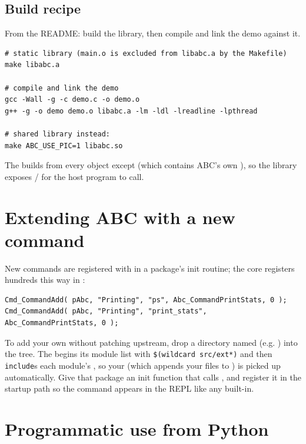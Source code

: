 \subsection{Build recipe}

From the README: build the library, then compile and link the demo against it.

\begin{lstlisting}[style=abcshell]
# static library (main.o is excluded from libabc.a by the Makefile)
make libabc.a

# compile and link the demo
gcc -Wall -g -c demo.c -o demo.o
g++ -g -o demo demo.o libabc.a -lm -ldl -lreadline -lpthread

# shared library instead:
make ABC_USE_PIC=1 libabc.so
\end{lstlisting}

\noindent The  builds  from every object except
 (which contains ABC's own ), so the
library exposes / for the host program to call.

\section{Extending ABC with a new command}

New commands are registered with  in a package's init routine; the core registers hundreds this way in
:

\begin{lstlisting}[style=abccode]
Cmd_CommandAdd( pAbc, "Printing", "ps", Abc_CommandPrintStats, 0 );
Cmd_CommandAdd( pAbc, "Printing", "print_stats", Abc_CommandPrintStats, 0 );
\end{lstlisting}

\noindent To add your own without patching upstream, drop a directory named
 (e.g. ) into the tree. The 
begins its module list with \verb|$(wildcard src/ext*)| and then
\verb|include|s each module's , so your 
(which appends your  files to ) is picked up automatically. Give
that package an init function that calls , and register it in
the startup path so the command appears in the REPL like any built-in.

\section{Programmatic use from Python}

